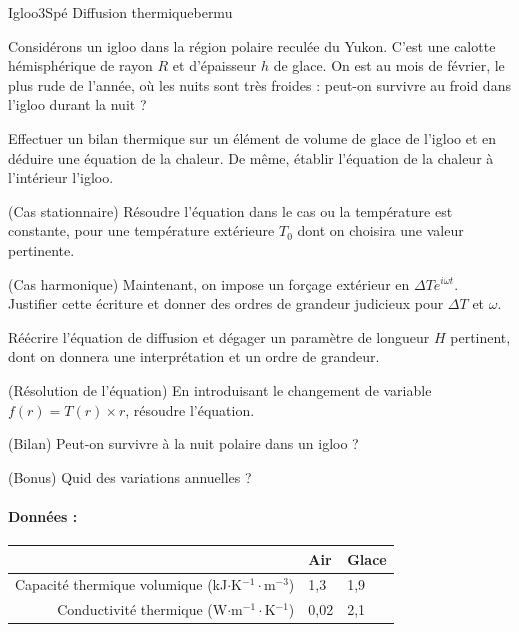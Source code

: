 \begin{exercise}{Igloo}{3}{Spé}
{Diffusion thermique}{bermu}

Considérons un igloo dans la région polaire reculée du Yukon. C'est une calotte hémisphérique de rayon $R$ et d'épaisseur $h$ de glace. On est au mois de février, le plus rude de l'année, où les nuits sont très froides : peut-on survivre au froid dans l'igloo durant la nuit ?

\begin{questions}
    \questioncours Effectuer un bilan thermique sur un élément de volume de glace de l'igloo et en déduire une équation  de la chaleur. De même, établir l'équation de la chaleur à l'intérieur l'igloo.
    
    \question (\textsf{Cas stationnaire}) Résoudre l'équation dans le cas ou la température est constante, pour une température extérieure $T_0$ dont on choisira une valeur pertinente.
    
    \question (\textsf{Cas harmonique}) Maintenant, on impose un forçage extérieur en $\Delta T e^{i\omega t}$. \\ Justifier cette écriture et donner des ordres de grandeur judicieux pour $\Delta T$ et $\omega$.
    
    \question Réécrire l'équation de diffusion et dégager un paramètre de longueur $H$ pertinent, dont on donnera une interprétation et un ordre de grandeur.
    
    \question (\textsf{Résolution de l'équation}) En introduisant le changement de variable $f(r) = T(r)\times r$, résoudre l'équation.
    
    \question (\textsf{Bilan}) Peut-on survivre à la nuit polaire dans un igloo ?
    
    \question (\textsf{Bonus}) Quid des variations annuelles ?
\end{questions}

\paragraph{Données :}

\begin{center}
    \begin{tabular}{r|ll}
       &  Air      & Glace  \\ \hline
    Capacité thermique volumique (kJ$\cdot$K$^{-1}\cdot$m$^{-3}$) &
    1,3 & 1,9 \\
    Conductivité thermique (W$\cdot$m$^{-1}\cdot$K$^{-1}$) &
    0,02 & 2,1 \\ \hline
    \end{tabular}
\end{center}


\end{exercise}
